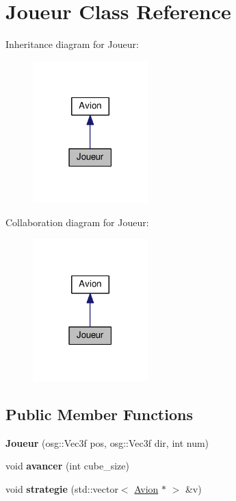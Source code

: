 \hypertarget{classJoueur}{\section{Joueur Class Reference}
\label{classJoueur}
}


Inheritance diagram for Joueur\+:
\nopagebreak
\begin{figure}[H]
\begin{center}
\leavevmode
\includegraphics[width=126pt]{classJoueur__inherit__graph}
\end{center}
\end{figure}


Collaboration diagram for Joueur\+:
\nopagebreak
\begin{figure}[H]
\begin{center}
\leavevmode
\includegraphics[width=126pt]{classJoueur__coll__graph}
\end{center}
\end{figure}
\subsection*{Public Member Functions}
\begin{DoxyCompactItemize}
\item 
\hypertarget{classJoueur_a90a46b036bb91cf837363f6c27726229}{{\bfseries Joueur} (osg\+::\+Vec3f pos, osg\+::\+Vec3f dir, int num)}\label{classJoueur_a90a46b036bb91cf837363f6c27726229}

\item 
\hypertarget{classJoueur_af72d15c1c70d15361120094d93563ba1}{void {\bfseries avancer} (int cube\+\_\+size)}\label{classJoueur_af72d15c1c70d15361120094d93563ba1}

\item 
\hypertarget{classJoueur_a7fd8856b0a69a3ba566ba9ab8c850a60}{void {\bfseries strategie} (std\+::vector$<$ \hyperlink{classAvion}{Avion} $\ast$ $>$ \&v)}\label{classJoueur_a7fd8856b0a69a3ba566ba9ab8c850a60}

\end{DoxyCompactItemize}
